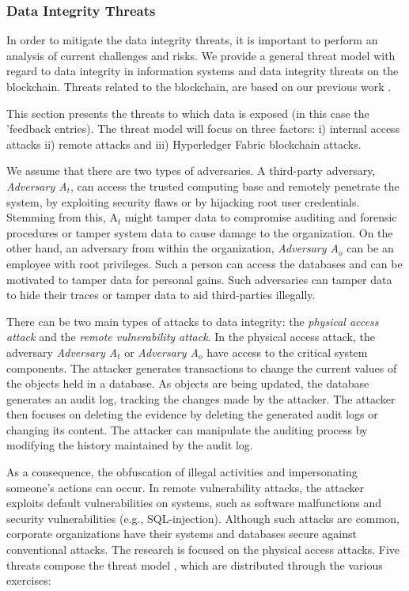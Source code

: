 \documentclass[12pt,a4paper]{article}
\theoremstyle{definition}
\begin{document}
\subsubsection{Data Integrity Threats}
\label{sec: threat_model}
In order to mitigate the data integrity threats, it is important to perform an analysis of current challenges and risks.
We provide a general threat model with regard to data integrity in information systems and data integrity threats on the blockchain. Threats related to the blockchain, are based on our previous work \cite{belchior2019_audits}.


This section presents the threats to which data is exposed (in this case the 'feedback entries). The threat model will focus on three factors: i) internal access attacks ii) remote attacks and iii) Hyperledger Fabric blockchain attacks.

We assume that there are two types of adversaries. A third-party adversary, \emph{Adversary A$_{t}$}, can access the trusted computing base and remotely penetrate the system, by exploiting security flaws or by hijacking root user credentials. Stemming from this, A$_{t}$ might tamper data to compromise auditing and forensic procedures or tamper system data to cause damage to the organization. On the other hand, an adversary from within the organization, \emph{Adversary A$_{o}$} can be an employee with root privileges. Such a person can access the databases and can be motivated to tamper data for personal gains. Such adversaries can tamper data to hide their traces or tamper data to aid third-parties illegally.

There can be two main types of attacks to data integrity: the \emph{physical access attack} and the \emph{remote vulnerability attack}. In the physical access attack, the adversary \emph{Adversary A$_{t}$} or \emph{Adversary A$_{o}$} have access to the critical system components. The attacker generates transactions to change the current values of the objects held in a database. As objects are being updated, the database generates an audit log, tracking the changes made by the attacker. The attacker then focuses on deleting the evidence by deleting the generated audit logs or changing its content. The attacker can manipulate the auditing process by modifying the history maintained by the audit log.

As a consequence, the obfuscation of illegal activities and impersonating someone's actions can occur. In remote vulnerability attacks, the attacker exploits default vulnerabilities on systems, such as software malfunctions and security vulnerabilities (e.g., SQL-injection). Although such attacks are common, corporate organizations have their systems and databases secure against conventional attacks. The research is focused on the physical access attacks. Five threats compose the threat model \cite{belchior2019_audits}, which are distributed through the various exercises:
\end{document}
